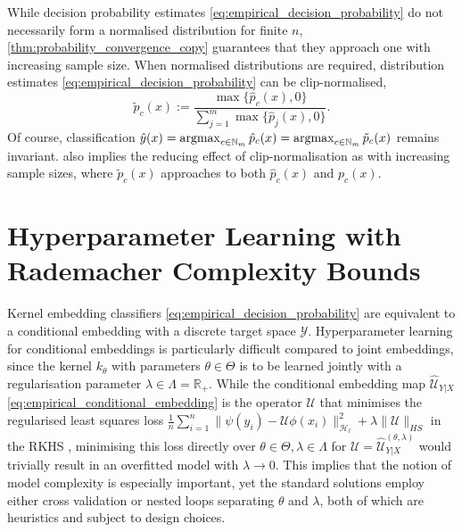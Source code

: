 \documentclass{article}
\newcommand{\argmax}{\operatornamewithlimits{argmax}}
\begin{document}
	While decision probability estimates \eqref{eq:empirical_decision_probability} do not necessarily form a normalised distribution for finite $n$, \cref{thm:probability_convergence_copy} guarantees that they approach one with increasing sample size. When normalised distributions are required, distribution estimates \eqref{eq:empirical_decision_probability} can be clip-normalised,
	\begin{equation}
		\tilde{p}_{c}(x) := \frac{\max\{\hat{p}_{c}(x), 0\}}{\sum_{j = 1}^{m} \max\{\hat{p}_{j}(x), 0\}}.
	\label{eq:empirical_decision_probability_clip_normalised}
	\end{equation}
	Of course, classification $\hat{y}(x) = \argmax_{c \in \mathbb{N}_{m}} \hat{p}_{c}(x) = \argmax_{c \in \mathbb{N}_{m}} \tilde{p}_{c}(x)$ remains invariant.   also implies the reducing effect of clip-normalisation as with increasing sample sizes, where $\tilde{p}_{c}(x)$ approaches to both $\hat{p}_{c}(x)$ and $p_{c}(x)$.
	
\section{Hyperparameter Learning with Rademacher Complexity Bounds}
\label{sec:hyperparameter_learning}

	Kernel embedding classifiers \eqref{eq:empirical_decision_probability} are equivalent to a conditional embedding with a discrete target space $\mathcal{Y}$. Hyperparameter learning for conditional embeddings is particularly difficult compared to joint embeddings, since the kernel $k_{\theta}$ with parameters $\theta \in \Theta$ is to be learned jointly with a regularisation parameter $\lambda \in \Lambda = \mathbb{R}_{+}$. While the conditional embedding map $\hat{\mathcal{U}}_{Y | X}$ \eqref{eq:empirical_conditional_embedding} is the operator $\mathcal{U}$ that minimises the regularised least squares loss $\frac{1}{n} \sum_{i = 1}^{n} \| \psi(y_{i}) - \mathcal{U} \phi(x_{i}) \|_{\mathcal{H}_{l}}^{2} + \lambda \| \mathcal{U} \|_{HS}$ in the RKHS \citep{song2013kernel}, minimising this loss directly over $\theta \in \Theta, \lambda \in \Lambda$ for $\mathcal{U} = \hat{\mathcal{U}}^{(\theta, \lambda)}_{Y | X}$ would trivially result in an overfitted model with $\lambda \rightarrow 0$. This implies that the notion of model complexity is especially important, yet the standard solutions employ either cross validation or nested loops separating $\theta$ and $\lambda$, both of which are heuristics and subject to design choices.
	
\end{document}
